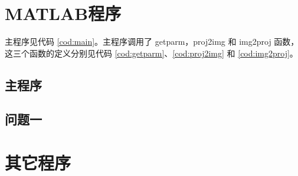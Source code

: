 \setlength{\parskip}{3pt}
\section{MATLAB程序}\label{sec:cod}
主程序见代码 \ref{cod:main}。主程序调用了 getparm，proj2img 和 img2proj 函数，这三个函数的定义分别见代码 \ref{cod:getparm}、\ref{cod:proj2img} 和 \ref{cod:img2proj}。

\subsection{主程序}


\subsection{问题一}


\section{其它程序}



